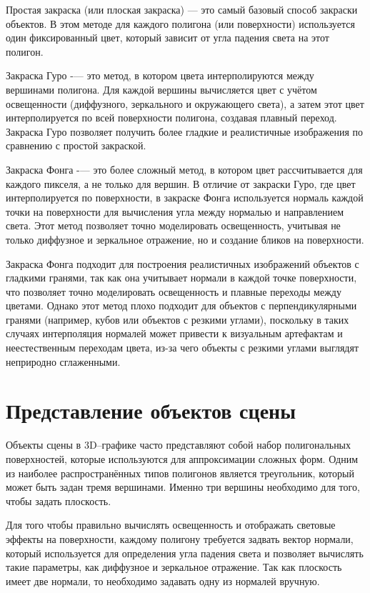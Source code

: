 Простая закраска (или плоская закраска) — это самый базовый способ закраски объектов. В этом методе для каждого полигона (или поверхности) используется один фиксированный цвет, который зависит от угла падения света на этот полигон.

Закраска Гуро -— это метод, в котором цвета интерполируются между вершинами полигона. Для каждой вершины вычисляется цвет с учётом освещенности (диффузного, зеркального и окружающего света), а затем этот цвет интерполируется по всей поверхности полигона, создавая плавный переход. Закраска Гуро позволяет получить более гладкие и реалистичные изображения по сравнению с простой закраской.

Закраска Фонга -— это более сложный метод, в котором цвет рассчитывается для каждого пикселя, а не только для вершин. В отличие от закраски Гуро, где цвет интерполируется по поверхности, в закраске Фонга используется нормаль каждой точки на поверхности для вычисления угла между нормалью и направлением света. Этот метод позволяет точно моделировать освещенность, учитывая не только диффузное и зеркальное отражение, но и создание бликов на поверхности.

Закраска Фонга подходит для построения реалистичных изображений объектов с гладкими гранями, так как она учитывает нормали в каждой точке поверхности, что позволяет точно моделировать освещенность и плавные переходы между цветами. Однако этот метод плохо подходит для объектов с перпендикулярными гранями (например, кубов или объектов с резкими углами), поскольку в таких случаях интерполяция нормалей может привести к визуальным артефактам и неестественным переходам цвета, из-за чего объекты с резкими углами выглядят неприродно сглаженными.

\section{Представление объектов сцены}
Объекты сцены в 3D--графике часто представляют собой набор полигональных поверхностей, которые используются для аппроксимации сложных форм. Одним из наиболее распространённых типов полигонов является треугольник, который может быть задан тремя вершинами. Именно три вершины необходимо для того, чтобы задать плоскость.

Для того чтобы правильно вычислять освещенность и отображать световые эффекты на поверхности, каждому полигону требуется задвать вектор нормали, который используется для определения угла падения света и позволяет вычислять такие параметры, как диффузное и зеркальное отражение. Так как плоскость имеет две нормали, то необходимо задавать одну из нормалей вручную. 




